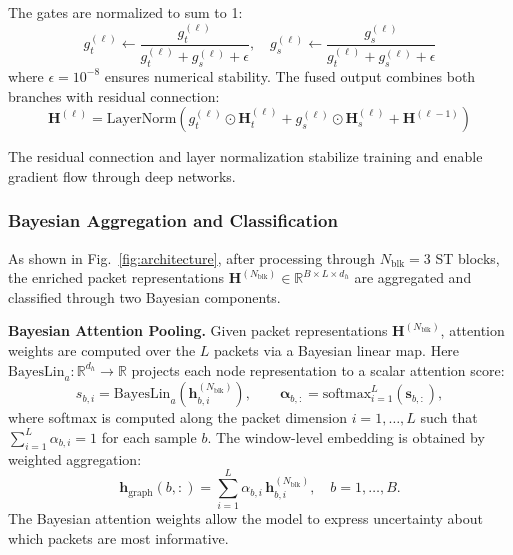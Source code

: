 \documentclass[lettersize,journal]{IEEEtran}
\begin{document}
The gates are normalized to sum to 1:
\begin{equation}
g_t^{(\ell)} \leftarrow \frac{g_t^{(\ell)}}{g_t^{(\ell)} + g_s^{(\ell)} + \epsilon}, \quad g_s^{(\ell)} \leftarrow \frac{g_s^{(\ell)}}{g_t^{(\ell)} + g_s^{(\ell)} + \epsilon}
\end{equation}
where $\epsilon=10^{-8}$ ensures numerical stability. The fused output combines both branches with residual connection:
\begin{equation}
\mathbf{H}^{(\ell)} = \text{LayerNorm}\!\left(g_t^{(\ell)} \odot \mathbf{H}_t^{(\ell)} + g_s^{(\ell)} \odot \mathbf{H}_s^{(\ell)} + \mathbf{H}^{(\ell-1)}\right)
\end{equation}

The residual connection and layer normalization stabilize training and enable gradient flow through deep networks.





\subsubsection{Bayesian Aggregation and Classification}

As shown in Fig.~\ref{fig:architecture}, after processing through $N_{\text{blk}}=3$ ST blocks, the enriched packet representations $\mathbf{H}^{(N_{\text{blk}})} \in \mathbb{R}^{B \times L \times d_h}$ are aggregated and classified through two Bayesian components.

\textbf{Bayesian Attention Pooling.}
Given packet representations $\mathbf{H}^{(N_{\text{blk}})}$, attention weights are computed over the $L$ packets via a Bayesian linear map. Here $\mathrm{BayesLin}_a:\mathbb{R}^{d_h}\to\mathbb{R}$ projects each node representation to a scalar attention score:
\begin{equation}
s_{b,i}=\mathrm{BayesLin}_a\!\left(\mathbf{h}^{(N_{\text{blk}})}_{b,i}\right),\qquad
\boldsymbol{\alpha}_{b,:}=\mathrm{softmax}_{i=1}^{L}\!\left(\mathbf{s}_{b,:}\right),
\label{eq:attn-weight}
\end{equation}
where softmax is computed along the packet dimension $i=1,\ldots,L$ such that $\sum_{i=1}^{L}\alpha_{b,i}=1$ for each sample $b$. The window-level embedding is obtained by weighted aggregation:
\begin{equation}
\mathbf{h}_{\mathrm{graph}}(b,:)=\sum_{i=1}^{L}\alpha_{b,i}\,\mathbf{h}^{(N_{\text{blk}})}_{b,i},\quad b=1,\dots,B.
\label{eq:attn-pool}
\end{equation}
The Bayesian attention weights allow the model to express uncertainty about which packets are most informative.
\end{document}
